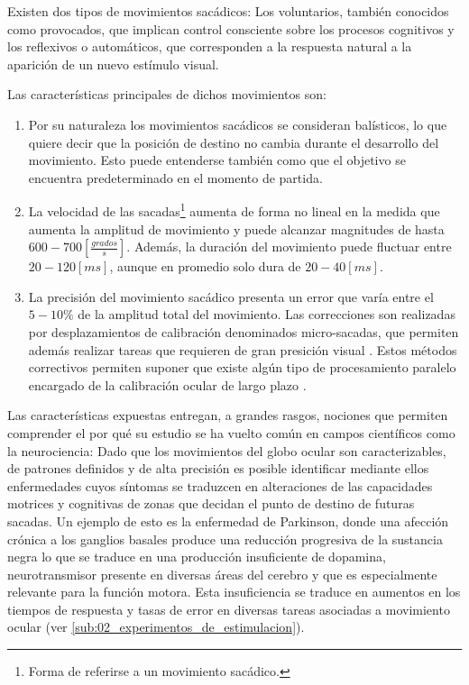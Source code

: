 \documentclass[../main.tex]{subfiles}
\begin{document}
		Existen dos tipos de movimientos sacádicos: Los voluntarios, también conocidos como provocados, que implican control consciente sobre los procesos cognitivos y los reflexivos o automáticos, que corresponden a la respuesta natural a la aparición de un nuevo estímulo visual.

		Las características principales de dichos movimientos son:
		\begin{enumerate}\setlength\itemsep{-0.5em}
			\item Por su naturaleza los movimientos sacádicos se consideran balísticos, lo que quiere decir que la posición de destino no cambia durante el desarrollo del movimiento. Esto puede entenderse también como que el objetivo se encuentra predeterminado en el momento de partida.

			\item La velocidad de las sacadas\footnote{Forma de referirse a un movimiento sacádico.} aumenta de forma no lineal en la medida que aumenta la amplitud de movimiento y puede alcanzar magnitudes de hasta $600 - 700[\frac{grados}{s}]$. Además, la duración del movimiento puede fluctuar entre $20 - 120[ms]$, aunque en promedio solo dura de $20-40[ms]$. 

			\item La precisión del movimiento sacádico presenta un error que varía entre el $5-10\%$ de la amplitud total del movimiento. Las correcciones son realizadas por desplazamientos de calibración denominados micro-sacadas, que permiten además realizar tareas que requieren de gran presición visual \cite{article:movOcular4}. Estos métodos correctivos permiten suponer que existe algún tipo de procesamiento paralelo encargado de la calibración ocular de largo plazo \cite{article:movOcular2}.  

		\end{enumerate}

		Las características expuestas entregan, a grandes rasgos, nociones que permiten comprender el por qué su estudio se ha vuelto común en campos científicos como la neurociencia: Dado que los movimientos del globo ocular son caracterizables, de patrones definidos y de alta precisión es posible identificar mediante ellos enfermedades cuyos síntomas se traduzcen en alteraciones de las capacidades motrices y cognitivas de zonas que decidan el punto de destino de futuras sacadas. Un ejemplo de esto es la enfermedad de Parkinson, donde una afección crónica a los ganglios basales produce una reducción progresiva de la sustancia negra lo que se traduce en una producción insuficiente de dopamina, neurotransmisor presente en diversas áreas del cerebro y que es especialmente relevante para la función motora. Esta insuficiencia se traduce en aumentos en los tiempos de respuesta y tasas de error en diversas tareas asociadas a movimiento ocular \cite{article:tests_1, article:tests_2, article:tests_3, article:tests_4} (ver \ref{sub:02_experimentos_de_estimulacion}).    
\end{document}
